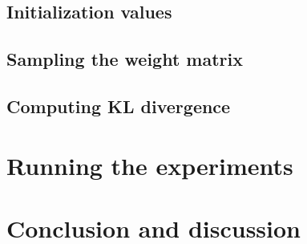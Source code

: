 \documentclass[11pt]{article}
\begin{document}
    \subsection{Initialization values}

    \subsection{Sampling the weight matrix}\label{subsec:sampling-the-weight-matrix}

    \subsection{Computing KL divergence}

    \section{Running the experiments}\label{sec:running-the-experiments}


    \section{Conclusion and discussion}\label{sec:conclusion-and-discussion}

    
    
\end{document}
